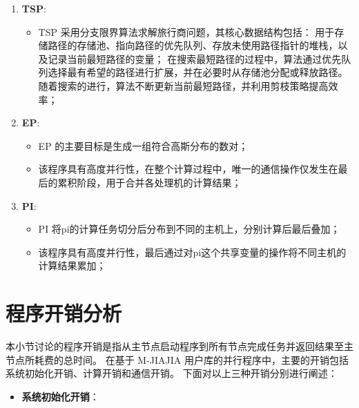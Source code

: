 {\begin{enumerate}[leftmargin=1em, align=left]
\begin{itemize}[leftmargin=*, nosep]
                  \item SOR 采用红黑格的逐次超松弛法（Successive Over-Relaxation, SOR）来求解偏微分方程。
                        在并行实现中，红黑两个数组被划分为大小接近的长方块，并分配给不同处理机进行计算，
                        各处理机通过 barrier 操作进行同步，确保所有处理机都能获取最新的计算结果；
              \end{itemize}
        \item \textbf{TSP}:
              \begin{itemize}[leftmargin=*, nosep]
                  \item TSP 采用分支限界算法求解旅行商问题，其核心数据结构包括：
                        用于存储路径的存储池、指向路径的优先队列、存放未使用路径指针的堆栈，以及记录当前最短路径的变量；
                        在搜索最短路径的过程中，算法通过优先队列选择最有希望的路径进行扩展，并在必要时从存储池分配或释放路径。
                        随着搜索的进行，算法不断更新当前最短路径，并利用剪枝策略提高效率；
              \end{itemize}
        \item \textbf{EP}:
              \begin{itemize}[leftmargin=*, nosep]
                  \item EP 的主要目标是生成一组符合高斯分布的数对；
                  \item 该程序具有高度并行性，在整个计算过程中，唯一的通信操作仅发生在最后的累积阶段，用于合并各处理机的计算结果；
              \end{itemize}
        \item \textbf{PI}:

              \begin{itemize}[leftmargin=*, nosep]
                  \item PI 将pi的计算任务切分后分布到不同的主机上，分别计算后最后叠加；
                  \item 该程序具有高度并行性，最后通过对pi这个共享变量的操作将不同主机的计算结果累加；
              \end{itemize}
    \end{enumerate}

    \section{程序开销分析}\label{sec:程序开销分析}
    本小节讨论的程序开销是指从主节点启动程序到所有节点完成任务并返回结果至主节点所耗费的总时间。
    在基于 M-JIAJIA 用户库的并行程序中，主要的开销包括系统初始化开销、计算开销和通信开销。
    下面对以上三种开销分别进行阐述：
    \begin{itemize}
        \item \textbf{系统初始化开销}：


\end{itemize}}
